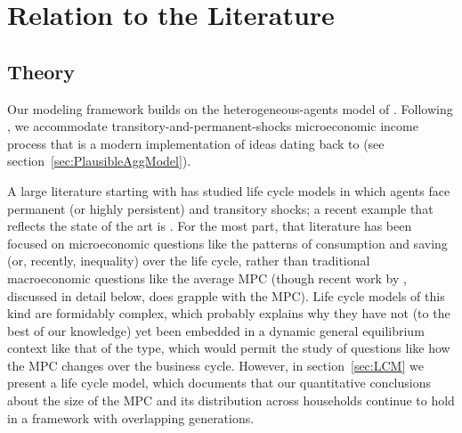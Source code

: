 \documentclass[12pt,titlepage]{econtex}
\begin{document}
\section{Relation to the Literature}

\subsection{Theory}

Our modeling framework builds on the heterogeneous-agents model of \cite{ksHeteroPort,ksHetero}. Following \cite{cstKS}, we accommodate transitory-and-permanent-shocks microeconomic income process that is a
modern implementation of ideas dating back to \cite{friedmanATheory} (see section~\ref{sec:PlausibleAggModel}).

A large literature starting with \cite{zeldesStochastic} has studied life
cycle models in which agents face permanent (or highly persistent) and
transitory shocks; a recent example that reflects the state of the art
is \cite{kaplanInequality}.  For the most part, that literature has been focused
on microeconomic questions like the patterns of consumption and saving
(or, recently, inequality) over the life cycle, rather than
traditional macroeconomic questions like the average MPC (though
recent work by \cite{kvStim}, discussed in detail below, does grapple
with the MPC).  Life cycle models of this kind are formidably complex, which probably
explains why they have not (to the best of our knowledge) yet been
embedded in a dynamic general equilibrium context like that of
the \cite{ksHetero} type, which would permit the study of questions
like how the MPC changes over the business cycle. However, in section~\ref{sec:LCM} we present a life cycle model, which documents that our quantitative conclusions about the size of the MPC and its distribution
across households continue to hold in a framework with overlapping generations.
\end{document}
